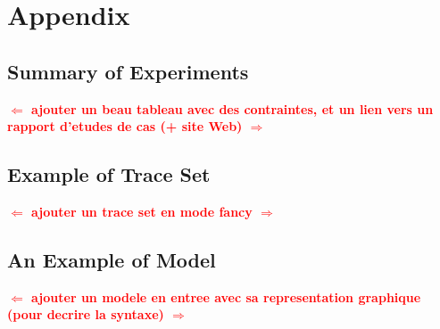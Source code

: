 \documentclass{llncs}
\newcommand{\commentaire}[1]{\textcolor{red}{\textbf{$\Leftarrow$  #1 $\Rightarrow$}}}
\begin{document}
\newpage


\appendix

\section*{Appendix}

\subsection*{Summary of Experiments}

\commentaire{ajouter un beau tableau avec des contraintes, et un lien vers un rapport d'etudes de cas (+ site Web)}

\subsection*{Example of Trace Set}

\commentaire{ajouter un trace set en mode fancy}

\subsection*{An Example of Model}

\commentaire{ajouter un modele en entree avec sa representation graphique (pour decrire la syntaxe)}
\end{document}
